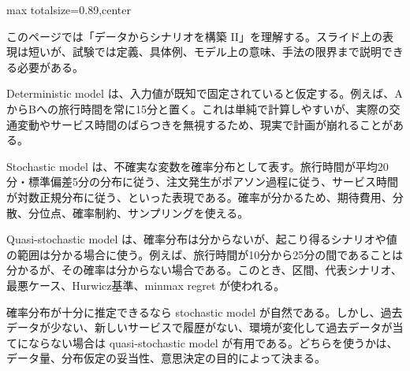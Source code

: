 \begin{minipage}[t]{0.58\textwidth}
\begin{adjustbox}{max totalsize={\textwidth}{0.89\textheight},center}
\begin{minipage}{\textwidth}\scriptsize
{}このページでは「データからシナリオを構築 II」を理解する。スライド上の表現は短いが、試験では定義、具体例、モデル上の意味、手法の限界まで説明できる必要がある。\par
Deterministic model は、入力値が既知で固定されていると仮定する。例えば、AからBへの旅行時間を常に15分と置く。これは単純で計算しやすいが、実際の交通変動やサービス時間のばらつきを無視するため、現実で計画が崩れることがある。\par
Stochastic model は、不確実な変数を確率分布として表す。旅行時間が平均20分・標準偏差5分の分布に従う、注文発生がポアソン過程に従う、サービス時間が対数正規分布に従う、といった表現である。確率が分かるため、期待費用、分散、分位点、確率制約、サンプリングを使える。\par
Quasi-stochastic model は、確率分布は分からないが、起こり得るシナリオや値の範囲は分かる場合に使う。例えば、旅行時間が10分から25分の間であることは分かるが、その確率は分からない場合である。このとき、区間、代表シナリオ、最悪ケース、Hurwicz基準、minmax regret が使われる。\par
確率分布が十分に推定できるなら stochastic model が自然である。しかし、過去データが少ない、新しいサービスで履歴がない、環境が変化して過去データが当てにならない場合は quasi-stochastic model が有用である。どちらを使うかは、データ量、分布仮定の妥当性、意思決定の目的によって決まる。\par

\end{minipage}
\end{adjustbox}
\end{minipage}
